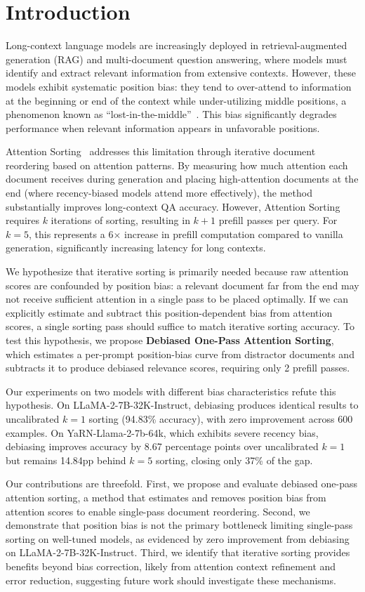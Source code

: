 \section{Introduction}
\label{sec:intro}

Long-context language models are increasingly deployed in retrieval-augmented generation (RAG) and multi-document question answering, where models must identify and extract relevant information from extensive contexts. However, these models exhibit systematic position bias: they tend to over-attend to information at the beginning or end of the context while under-utilizing middle positions, a phenomenon known as ``lost-in-the-middle''~\citep{Liu2023LostIT}. This bias significantly degrades performance when relevant information appears in unfavorable positions.

Attention Sorting~\citep{Peysakhovich2023AttentionSC} addresses this limitation through iterative document reordering based on attention patterns. By measuring how much attention each document receives during generation and placing high-attention documents at the end (where recency-biased models attend more effectively), the method substantially improves long-context QA accuracy. However, Attention Sorting requires $k$ iterations of sorting, resulting in $k+1$ prefill passes per query. For $k=5$, this represents a 6$\times$ increase in prefill computation compared to vanilla generation, significantly increasing latency for long contexts.

We hypothesize that iterative sorting is primarily needed because raw attention scores are confounded by position bias: a relevant document far from the end may not receive sufficient attention in a single pass to be placed optimally. If we can explicitly estimate and subtract this position-dependent bias from attention scores, a single sorting pass should suffice to match iterative sorting accuracy. To test this hypothesis, we propose \textbf{Debiased One-Pass Attention Sorting}, which estimates a per-prompt position-bias curve from distractor documents and subtracts it to produce debiased relevance scores, requiring only 2 prefill passes.

Our experiments on two models with different bias characteristics refute this hypothesis. On LLaMA-2-7B-32K-Instruct, debiasing produces identical results to uncalibrated $k=1$ sorting (94.83\% accuracy), with zero improvement across 600 examples. On YaRN-Llama-2-7b-64k, which exhibits severe recency bias, debiasing improves accuracy by 8.67 percentage points over uncalibrated $k=1$ but remains 14.84pp behind $k=5$ sorting, closing only 37\% of the gap.

Our contributions are threefold. First, we propose and evaluate debiased one-pass attention sorting, a method that estimates and removes position bias from attention scores to enable single-pass document reordering. Second, we demonstrate that position bias is not the primary bottleneck limiting single-pass sorting on well-tuned models, as evidenced by zero improvement from debiasing on LLaMA-2-7B-32K-Instruct. Third, we identify that iterative sorting provides benefits beyond bias correction, likely from attention context refinement and error reduction, suggesting future work should investigate these mechanisms.
